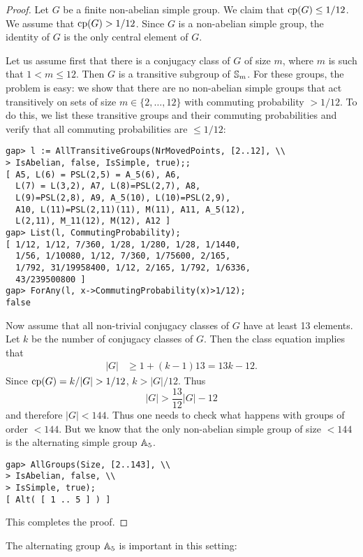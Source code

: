 \begin{proof}
Let $G$ be a finite non-abelian simple group. We claim that 
$\operatorname{cp}(G)\leq1/12$. 
We assume that $\operatorname{cp}(G)>1/12$. Since
$G$ is a non-abelian simple group, 
the identity of $G$ is the only central element of $G$. 

Let us assume first that there is a conjugacy class of $G$ of size $m$, where
$m$ is such that $1<m\leq 12$. Then $G$ is a transitive subgroup of $\mathbb{S}_m$.
For these groups, the problem is easy: we show that there are no non-abelian simple groups
that act transitively on sets of size $m\in\{2,\dots,12\}$ with commuting
probability $>1/12$. To do this, we list these transitive groups and their commuting
probabilities and verify that all commuting probabilities are $\leq
1/12$:
\begin{lstlisting}
gap> l := AllTransitiveGroups(NrMovedPoints, [2..12], \\
> IsAbelian, false, IsSimple, true);;
[ A5, L(6) = PSL(2,5) = A_5(6), A6, 
  L(7) = L(3,2), A7, L(8)=PSL(2,7), A8, 
  L(9)=PSL(2,8), A9, A_5(10), L(10)=PSL(2,9), 
  A10, L(11)=PSL(2,11)(11), M(11), A11, A_5(12), 
  L(2,11), M_11(12), M(12), A12 ]
gap> List(l, CommutingProbability);           
[ 1/12, 1/12, 7/360, 1/28, 1/280, 1/28, 1/1440, 
  1/56, 1/10080, 1/12, 7/360, 1/75600, 2/165, 
  1/792, 31/19958400, 1/12, 2/165, 1/792, 1/6336, 
  43/239500800 ]
gap> ForAny(l, x->CommutingProbability(x)>1/12);
false
\end{lstlisting}

Now assume that all non-trivial conjugacy classes of $G$ have at least 13 elements. Let $k$ be the number of conjugacy classes of $G$. 
Then the class equation implies that
\begin{align*}
	|G|&\geq 1+(k-1)13=13k-12.
\end{align*}
Since $\cp(G)=k/|G|>1/12$, $k>|G|/12$. Thus 
\[
|G|>\frac{13}{12}|G|-12
\]
and therefore $|G|<144$. Thus one needs to check what happens with groups
of order $<144$. 
But we know that the only non-abelian simple group of size
$<144$ is the alternating simple group $\mathbb{A}_5$.
\begin{lstlisting}
gap> AllGroups(Size, [2..143], \\
> IsAbelian, false, \\
> IsSimple, true);
[ Alt( [ 1 .. 5 ] ) ]
\end{lstlisting}    
This completes the proof. 
\end{proof}

The alternating group $\mathbb{A}_5$ is important in this setting:

